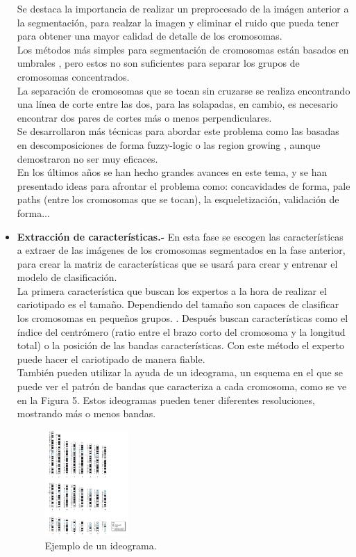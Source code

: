 \documentclass[12pt,letterpaper,titlepage]{article}
\begin{document}
\begin{itemize}
Se destaca la importancia de realizar un preprocesado de la imágen anterior a la segmentación, para realzar la imagen y eliminar el ruido que pueda tener para obtener una mayor calidad de detalle de los cromosomas.\\
Los métodos más simples para segmentación de cromosomas están basados en umbrales  \cite{135}, pero estos no son suficientes para separar los grupos de cromosomas concentrados.\\
La separación de cromosomas que se tocan sin cruzarse se realiza encontrando una línea de corte entre las dos, para las solapadas, en cambio, es necesario encontrar dos pares de cortes más o menos perpendiculares.\\
Se desarrollaron más técnicas para abordar este problema como las basadas en descomposiciones de forma fuzzy-logic \cite{136} o las region growing \cite{137}, aunque demostraron no ser muy eficaces.\\
En los últimos años se han hecho grandes avances en este tema, y se han presentado ideas para afrontar el problema como: concavidades de forma, pale paths (entre los cromosomas que se tocan), la esqueletización, validación
de forma...\\

\item  \textbf{Extracción de características.-} En esta fase se escogen las características a extraer de las imágenes de los cromosomas segmentados en la fase anterior, para crear la matriz de características que se usará para crear y entrenar el modelo de clasificación.\\
La primera característica que buscan los expertos a la hora de realizar el cariotipado es el tamaño. Dependiendo del tamaño son capaces de clasificar los cromosomas en pequeños grupos. \cite{131}. Después buscan características como el índice del centrómero (ratio entre el brazo corto del cromosoma y la longitud total) o la posición de las bandas características. Con este método el experto puede hacer el cariotipado de manera fiable.\\
También pueden utilizar la ayuda de un ideograma, un esquema en el que se puede ver el patrón de bandas que caracteriza a cada cromosoma, como se ve en la Figura 5. Estos ideogramas pueden tener diferentes resoluciones, mostrando más o menos bandas.

\begin{figure}
  \centering
    \includegraphics[width=0.3\textwidth]{5_Ideograma}
  \caption{Ejemplo de un ideograma.}
  \label{fig5:idiograma}
\end{figure}


\end{itemize}
\end{document}
